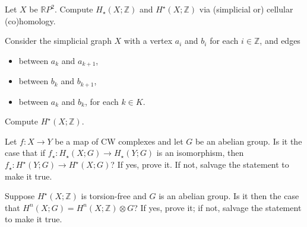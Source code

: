 \documentclass[12pt]{pset}
\newcommand{\Z}{\mathbb{Z}}
\newcommand{\RP}{\mathbb{R}P}
\begin{document}
\begin{problem}
  Let $X$ be $\RP^2$.  Compute $H_\star(X;\Z)$ and $H^\star(X;\Z)$ via
  (simplicial or) cellular (co)homology.
\end{problem}

\begin{problem}
  Consider the simplicial graph $X$ with a vertex $a_i$ and $b_i$ for each $i \in \Z$, and edges
  \begin{itemize}
  \item between $a_k$ and $a_{k+1}$,
  \item between $b_k$ and $b_{k+1}$,
  \item between $a_k$ and $b_k$, for each $k \in K$.
  \end{itemize}
  Compute $H^\star(X;\Z)$.
\end{problem}

\begin{problem}
  Let $f : X \to Y$ be a map of CW complexes and let $G$ be an abelian
  group.  Is it the case that if $f_\star : H_\star(X;G) \to
  H_\star(Y;G)$ is an isomorphism, then $f_\star : H^\star(Y;G) \to
  H^\star(X;G)$?  If yes, prove it.  If not, salvage the statement to
  make it true.
\end{problem}

\begin{problem}
  Suppose $H^\star(X;\Z)$ is torsion-free and $G$ is an abelian group.
  Is it then the case that $H^n(X;G) = H^n(X;\Z) \otimes G$?  If yes,
  prove it; if not, salvage the statement to make it true.
\end{problem}
\end{document}
